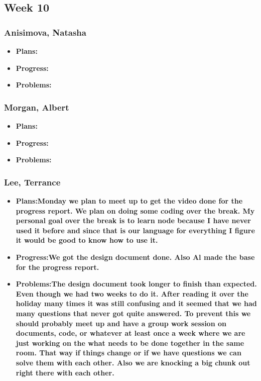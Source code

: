 \documentclass[10pt,draftclsnofoot,onecolumn]{IEEEtran}
\begin{document}
\subsection{Week 10}
\subsubsection{Anisimova, Natasha}
\begin{itemize}
	\item \textbf{Plans:}
	\item \textbf{Progress:}
	\item \textbf{Problems:}
\end{itemize}
\subsubsection{Morgan, Albert}
\begin{itemize}
	\item \textbf{Plans:}
	\item \textbf{Progress:}
	\item \textbf{Problems:}
\end{itemize}
\subsubsection{Lee, Terrance}
\begin{itemize}
	\item \textbf{Plans:Monday we plan to meet up to get the video done for the progress report.
We plan on doing some coding over the break. My personal goal over the break is to learn node because I have never used it before and since that is our language for everything I figure it would be good to know how to use it.}
	\item \textbf{Progress:We got the design document done. Also Al made the base for the progress report.}
	\item \textbf{Problems:The design document took longer to finish than expected. Even though we had two weeks to do it. After reading it over the holiday many times it was still confusing and it seemed that we had many questions that never got quite answered. To prevent this we should probably meet up and have a group work session on documents, code, or whatever at least once a week where we are just working on the what needs to be done together in the same room. That way if things change or if we have questions we can solve them with each other. Also we are knocking a big chunk out right there with each other.}
\end{itemize}
\end{document}
